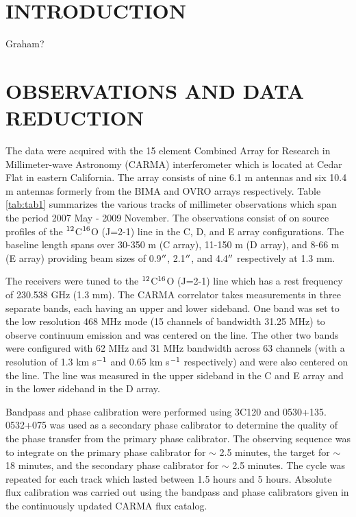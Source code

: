 \documentclass[preprint2]{aastex}
\begin{document}
\section{INTRODUCTION}

Graham?

\section{OBSERVATIONS AND DATA REDUCTION}

The data were acquired with the 15 element Combined Array for Research in Millimeter-wave Astronomy (CARMA) interferometer \citep{scot04} which is located at Cedar Flat in eastern California. The array consists of nine 6.1 m antennas and six 10.4 m antennas formerly from the BIMA and OVRO arrays respectively. Table \ref{tab:tab1} summarizes the various tracks of millimeter observations which span the period 2007 May - 2009 November. The observations consist of on source profiles of the $\rm{{}^{12}}$C$\rm{{}^{16}}$O (J=2-1) line in the C, D, and E array configurations. The baseline length spans over 30-350 m (C array), 11-150 m (D array), and 8-66 m (E array) providing beam sizes of 0.9$\mbox{$^{\prime\prime}$}$, 2.1$\mbox{$^{\prime\prime}$}$, and 4.4$\mbox{$^{\prime\prime}$}$ respectively at 1.3 mm. 

The receivers were tuned to the $\rm{{}^{12}}$C$\rm{{}^{16}}$O (J=2-1) line which has a rest frequency of 230.538 GHz (1.3 mm). The CARMA correlator takes measurements in three separate bands, each having an upper and lower sideband. One band was set to the low resolution 468 MHz mode (15 channels of bandwidth 31.25 MHz) to observe continuum emission and was centered on the line. The other two bands were configured with 62 MHz and 31 MHz bandwidth across 63 channels (with a resolution of 1.3 km s$\rm{{}^{-1}}$ and 0.65 km s$\rm{{}^{-1}}$ respectively) and were also centered on the line. The line was measured in the upper sideband in the C and E array and in the lower sideband in the D array.

Bandpass and phase calibration were performed using 3C120 and 0530+135. 0532+075 was used as a secondary phase calibrator to determine the quality of the phase transfer from the primary phase calibrator. The observing sequence was to integrate on the primary phase calibrator for $\sim$ 2.5 minutes, the target for $\sim$ 18 minutes, and the secondary phase calibrator for $\sim$ 2.5 minutes. The cycle was repeated for each track which lasted between 1.5 hours and 5 hours. Absolute flux calibration was carried out using the bandpass and phase calibrators given in the continuously updated CARMA flux catalog.
\end{document}
